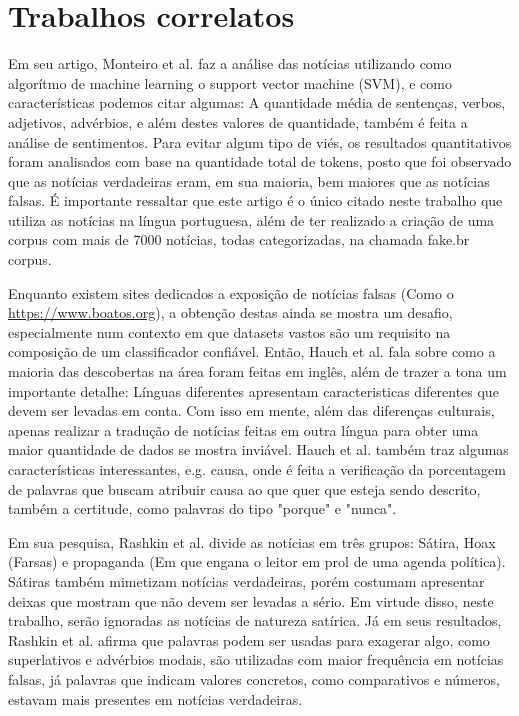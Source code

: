 \documentclass[conference]{IEEEtran}
\begin{document}
\section{Trabalhos correlatos}

Em seu artigo, Monteiro et al. \cite{b3} faz a análise das notícias utilizando como algorítmo de machine learning o support vector machine (SVM), e como características podemos citar algumas: A quantidade média de sentenças, verbos, adjetivos, advérbios, e além destes valores de quantidade, também é feita a análise de sentimentos. Para evitar algum tipo de viés, os resultados quantitativos foram analisados com base na quantidade total de tokens, posto que foi observado que as notícias verdadeiras eram, em sua maioria, bem maiores que as notícias falsas. É importante ressaltar que este artigo é o único citado neste trabalho que utiliza as notícias na língua portuguesa, além de ter realizado a criação de uma corpus com mais de 7000 notícias, todas categorizadas, na chamada fake.br corpus.

Enquanto existem sites dedicados a exposição de notícias falsas (Como o \url{https://www.boatos.org}), a obtenção destas ainda se mostra um desafio, especialmente num contexto em que datasets vastos são um requisito na composição de um classificador confiável. Então, Hauch et al. \cite{b4} fala sobre como a maioria das descobertas na área foram feitas em inglês, além de trazer a tona um importante detalhe: Línguas diferentes apresentam caracteristicas diferentes que devem ser levadas em conta. Com isso em mente, além das diferenças culturais, apenas realizar a tradução de notícias feitas em outra língua para obter uma maior quantidade de dados se mostra inviável. Hauch et al. também traz algumas características interessantes, e.g. causa, onde é feita a verificação da porcentagem de palavras que buscam atribuir causa ao que quer que esteja sendo descrito, também a certitude, como palavras do tipo "porque" e "nunca".

Em sua pesquisa, Rashkin et al. \cite{b5} divide as notícias em três grupos: Sátira, Hoax (Farsas) e propaganda (Em que engana o leitor em prol de uma agenda política). Sátiras também mimetizam notícias verdadeiras, porém costumam apresentar deixas que mostram que não devem ser levadas a sério. Em virtude disso, neste trabalho, serão ignoradas as notícias de natureza satírica. Já em seus resultados, Rashkin et al. afirma que palavras podem ser usadas para exagerar algo, como superlativos e advérbios modais, são utilizadas com maior frequência em notícias falsas, já palavras que indicam valores concretos, como comparativos e números, estavam mais presentes em notícias verdadeiras.
\end{document}
